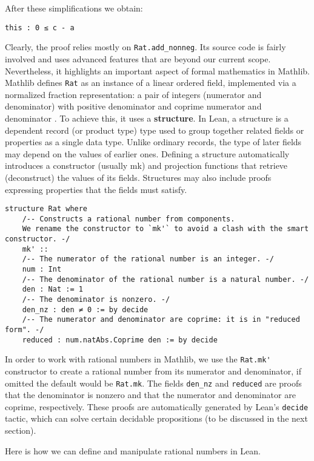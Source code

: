 After these simplifications we obtain:
\begin{lstlisting}[language=lean]
  this : 0 ≤ c - a
\end{lstlisting}
Clearly, the proof relies mostly on \lstinline[language=lean]|Rat.add_nonneg|. 
Its source code is fairly involved and uses advanced features 
that are beyond our current scope. Nevertheless, it highlights 
an important aspect of formal mathematics in Mathlib.
Mathlib defines \lstinline[language=lean]|Rat| as an instance of 
a linear ordered field, implemented via a normalized fraction 
representation: a pair of integers (numerator and denominator) 
with positive denominator and coprime numerator and denominator \cite{mathlibdoc}. 
To achieve this, it uses a \textbf{structure}. In Lean, a structure is a dependent record 
(or product type) type  used to group together related fields or properties as a single data type.
Unlike ordinary records, the type of later fields may depend on the values of earlier ones.
Defining a structure automatically introduces a constructor (usually mk) and projection 
functions that retrieve (deconstruct) the values of its fields.
Structures may also include proofs expressing properties that the fields must satisfy.
\begin{lstlisting}[language=lean,  float=!htb]
  structure Rat where
    /-- Constructs a rational number from components.
    We rename the constructor to `mk'` to avoid a clash with the smart constructor. -/
    mk' ::
    /-- The numerator of the rational number is an integer. -/
    num : Int
    /-- The denominator of the rational number is a natural number. -/
    den : Nat := 1
    /-- The denominator is nonzero. -/
    den_nz : den ≠ 0 := by decide
    /-- The numerator and denominator are coprime: it is in "reduced form". -/
    reduced : num.natAbs.Coprime den := by decide
\end{lstlisting}
In order to work with rational numbers in Mathlib, we use the
\lstinline[language=lean]|Rat.mk'| constructor to create a rational number from
its numerator and denominator, if omitted the default would be \lstinline[language=lean]|Rat.mk|.
The fields \lstinline[language=lean]|den_nz| and \lstinline[language=lean]|reduced| are proofs that 
the denominator is nonzero and that the numerator and denominator are coprime, respectively. 
These proofs are automatically generated by Lean's \lstinline[language=lean]|decide| tactic, which can 
solve certain decidable propositions (to be discussed in the next section).
\begin{example} 
  Here is how we can define and manipulate rational numbers in Lean.
\end{example}
